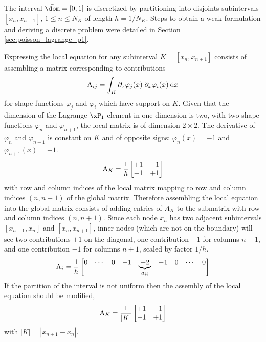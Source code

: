 The interval $\bar\dom = [0,1]$ is discretized by partitioning into disjoints subintervals $[x_{n}, x_{n+1}]$, $1\leq n \leq N_K$ of length $h = 1 / N_K$.
Steps to obtain a weak formulation and deriving a discrete problem were detailed in Section \ref{sec:poisson_lagrange_p1}.

Expressing the local equation for any subinterval $K = [x_{n}, x_{n+1}]$ consists of assembling a matrix corresponding to contributions
\begin{equation*}
{\mathrm A}_{ij} = \int_{K} \partial_{x}\varphi_j(x)\;\partial_{x}\varphi_i(x) \hspace{.5ex}{\mathrm d} x
\end{equation*}
for shape functions $\varphi_j$ and $\varphi_i$ which have support on $K$.
Given that the dimension of the Lagrange $\xPone$ element in one dimension is two, with two shape functions $\varphi_n$ and $\varphi_{n+1}$, the local matrix is of dimension $2\times 2$.
The derivative of $\varphi_n$ and $\varphi_{n+1}$ is constant on $K$ and of opposite signs: $\varphi_n(x) = -1$ and $\varphi_{n+1}(x) = +1$.
\begin{equation*}
{\mathrm A}_{K} = \frac{1}{h}
\begin{bmatrix}
+1 & -1 \\
-1 & +1 \\
\end{bmatrix}
\end{equation*}
with row and column indices of the local matrix mapping to row and column indices $(n , n+1)$ of the global matrix.
Therefore assembling the local equation into the global matrix consists of adding entries of $A_K$ to the submatrix with row and column indices $(n , n+1)$.
Since each node $x_n$ has two adjacent subintervals $[x_{n-1}, x_{n}]$ and $[x_{n}, x_{n+1}]$, inner nodes (which are not on the boundary) will see two contributions $+1$ on the diagonal, one contribution $-1$ for columns $n-1$, and one contribution $-1$ for columns $n+1$, scaled by factor $1/h$.
\begin{equation*}
{\mathrm A}_{i} = \frac{1}{h}
\begin{bmatrix}
0 & \cdots & 0 & -1 & \underbrace{+2}_{a_{ii}} & -1 & 0 & \cdots & 0
\end{bmatrix}
\end{equation*}
If the partition of the interval is not uniform then the assembly of the local equation should be modified,
\begin{equation*}
{\mathrm A}_{K} = \frac{1}{|K|}
\begin{bmatrix}
+1 & -1 \\
-1 & +1 \\
\end{bmatrix}
\end{equation*}
with $|K| = |x_{n+1} - x_{n}|$.

